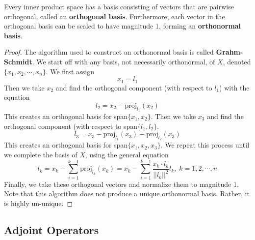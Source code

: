   \begin{theorem}
    Every inner product space has a basis consisting of vectors that are pairwise orthogonal, called an \textbf{orthogonal basis}. Furthermore, each vector in the orthogonal basis can be scaled to have magnitude 1, forming an \textbf{orthonormal basis}.  
  \end{theorem}
  \begin{proof}
    The algorithm used to construct an orthonormal basis is called \textbf{Grahm-Schmidt}. We start off with any basis, not necessarily orthonormal, of $X$, denoted $\{x_1, x_2, \cdots, x_n\}$. We first assign 
    \begin{equation}
      x_1 = l_1
    \end{equation}
    Then we take $x_2$ and find the orthogonal component (with respect to $l_1$) with the equation
    \begin{equation}
      l_2 = x_2 - \text{proj}_{l_1} (x_2)
    \end{equation}
    This creates an orthogonal basis for span$\{x_1, x_2\}$. Then we take $x_3$ and find the orthogonal component (with respect to span$\{l_1, l_2\}$. 
    \begin{equation}
      l_3 = x_3 - \text{proj}_{l_1} (x_3) - \text{proj}_{l_2} (x_3)
    \end{equation}
    This creates an orthogonal basis for span$\{x_1, x_2, x_3\}$. We repeat this process until we complete the basis of $X$, using the general equation
    \begin{equation}
      l_k = x_k - \sum_{i=1}^{k-1} \text{proj}_{l_k} (x_k) = x_k - \sum_{i=1}^{k-1} \frac{x_k \cdot l_k}{||l_k||^2} l_k, \; k = 1, 2, \cdots, n
    \end{equation}
    Finally, we take these orthogonal vectors and normalize them to magnitude 1. Note that this algorithm does not produce a unique orthonormal basis. Rather, it is highly un-unique. 
  \end{proof}

\subsection{Adjoint Operators}


